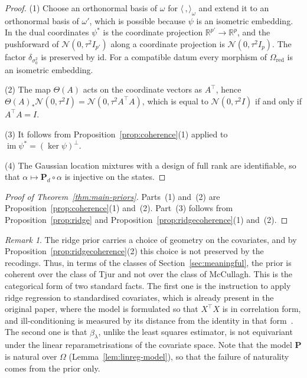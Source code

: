 \documentclass[11pt,a4paper]{article}
\theoremstyle{plain}
\theoremstyle{definition}
\theoremstyle{remark}
\newtheorem{remark}[theorem]{Remark}
\newcommand{\cat}[1]{\mathsf{#1}}
\newcommand{\catO}{\cat{\Omega}}
\newcommand{\id}{\mathrm{id}}
\newcommand{\R}{\mathbb{R}}
\newcommand{\Norm}{\mathcal{N}}
\begin{document}
\begin{proof}
(1) Choose an orthonormal basis of $\omega$ for
$\langle\,,\rangle_{\omega}$ and extend it to an orthonormal basis of
$\omega'$, which is possible because $\psi$ is an isometric embedding. In the
dual coordinates $\psi^{*}$ is the coordinate projection
$\R^{p'} \to \R^{p}$, and the pushforward of $\Norm(0,\tau^{2}I_{p'})$ along a
coordinate projection is $\Norm(0,\tau^{2}I_{p})$. The factor
$\delta_{\sigma_{0}^{2}}$ is preserved by $\id$. For a compatible datum every
morphism of $\catO_{\mathrm{red}}$ is an isometric embedding.

(2) The map $\Theta(A)$ acts on the coordinate vectors as $A^{\!\top}$, hence
$\Theta(A)_{*}\Norm(0,\tau^{2}I) = \Norm(0,\tau^{2}A^{\!\top}A)$, which is
equal to $\Norm(0,\tau^{2}I)$ if and only if $A^{\!\top}A = I$.

(3) It follows from Proposition~\ref{prop:coherence}(1) applied to
$\operatorname{im}\psi^{*} = (\ker\psi)^{\perp}$.

(4) The Gaussian location mixtures with a design of full rank are
identifiable, so that $\alpha \mapsto \mathbf{P}_{d}\circ\alpha$ is injective
on the states.
\end{proof}

\begin{proof}[Proof of Theorem~\ref{thm:main-priors}]
Parts~(1) and~(2) are Proposition~\ref{prop:coherence}(1) and~(2). Part~(3)
follows from Proposition~\ref{prop:ridge} and
Proposition~\ref{prop:ridgecoherence}(1) and~(2).
\end{proof}

\begin{remark}\label{rem:standardise}
The ridge prior carries a choice of geometry on the covariates, and by
Proposition~\ref{prop:ridgecoherence}(2) this choice is not preserved by the
recodings. Thus, in terms of the classes of Section~\ref{sec:meaningful}, the
prior is coherent over the class of Tjur and not over the class of McCullagh.
This is the categorical form of two standard facts. The first one is the
instruction to apply ridge regression to standardised covariates, which is
already present in the original paper, where the model is formulated so that
$X^{\!\top}X$ is in correlation form, and ill-conditioning is measured by its
distance from the identity in that
form~\cite[pp.~55--56]{hoerl_ridge_1970}. The second one is that
$\widehat\beta_{\lambda}$, unlike the least squares estimator, is not
equivariant under the linear reparametrisations of the covariate space. Note
that the model $\mathbf{P}$ is natural over $\catO$
(Lemma~\ref{lem:linreg-model}), so that the failure of naturality comes from
the prior only.
\end{remark}
\end{document}
